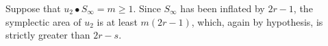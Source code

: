 \documentclass[12pt]{amsart}
\theoremstyle{definition}
\newcommand{\CC}{{\mathbb C}}
\begin{document}

\bigskip


 Suppose that $u_2 \bullet S_\infty=m \ge 1$. Since $S_\infty$ has been inflated  by $2r-1$, the  symplectic area of $u_2$ is at least $m(2r-1)$, which, again by hypothesis, is strictly greater than $2r-s$.

























\end{document}
